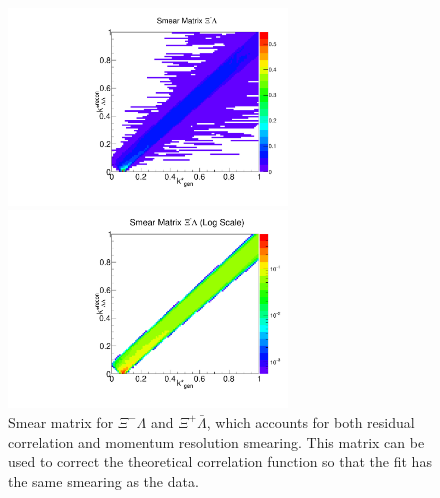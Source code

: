 \begin{figure}[ht]
\begin{minipage}{17.5pc}
\includegraphics[width=17.5pc]{Figures/SmearMatrices/2016-7-19-SmearMatrixXiCLambdaNormLLAA.pdf}
\end{minipage}\hspace{0.5pc}
\begin{minipage}{17.5pc}
\includegraphics[width=17.5pc]{Figures/SmearMatrices/2016-7-19-SmearMatrixXiCLambdaNormLLAALog.pdf}
\end{minipage} 
\caption[Smear matrix -- $\Xi^{-}\Lambda$ and $\Xi^{+}\bar{\Lambda}$]{
Smear matrix for $\Xi^{-}\Lambda$ and $\Xi^{+}\bar{\Lambda}$, which accounts for both residual correlation and momentum resolution smearing. This matrix can be used to correct the theoretical correlation function so that the fit has the same smearing as the data.
}
\end{figure}

